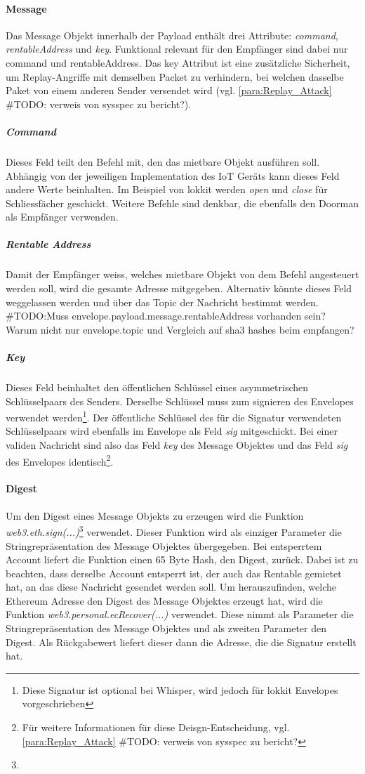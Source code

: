 \paragraph{Message}
\label{para:Message}
Das Message Objekt innerhalb der Payload enthält drei Attribute: \emph{command}, \emph{rentableAddress} und \emph{key}. Funktional relevant für den Empfänger sind dabei nur command und rentableAddress. Das key Attribut ist eine zusätzliche Sicherheit, um Replay-Angriffe mit demselben Packet zu verhindern, bei welchen dasselbe Paket von einem anderen Sender versendet wird (vgl. \ref{para:Replay_Attack} \#TODO: verweis von sysspec zu bericht?).
\subparagraph{Command}
\label{subpara:Command}
Dieses Feld teilt den Befehl mit, den das mietbare Objekt ausführen soll. Abhängig von der jeweiligen Implementation des IoT Geräts kann dieses Feld andere Werte beinhalten. Im Beispiel von lokkit werden \emph{open} und \emph{close} für Schliessfächer geschickt. Weitere Befehle sind denkbar, die ebenfalls den Doorman als Empfänger verwenden.
\subparagraph{Rentable Address}
Damit der Empfänger weiss, welches mietbare Objekt von dem Befehl angesteuert werden soll, wird die gesamte Adresse mitgegeben. Alternativ könnte dieses Feld weggelassen werden und über das Topic der Nachricht bestimmt werden.
\\\#TODO:Muss envelope.payload.message.rentableAddress vorhanden sein? Warum nicht nur envelope.topic und Vergleich auf sha3 hashes beim empfangen?

\subparagraph{Key}
\label{sys_para:Key}
Dieses Feld beinhaltet den öffentlichen Schlüssel eines asymmetrischen Schlüsselpaars des Senders. Derselbe Schlüssel muss zum signieren des Envelopes verwendet werden\footnote{Diese Signatur ist optional bei Whisper, wird jedoch für lokkit Envelopes vorgeschrieben}. Der öffentliche Schlüssel des für die Signatur verwendeten Schlüsselpaars wird ebenfalls im Envelope als Feld \emph{sig} mitgeschickt. Bei einer validen Nachricht sind also das Feld \emph{key} des Message Objektes und das Feld \emph{sig} des Envelopes identisch\footnote{Für weitere Informationen für diese Deisgn-Entscheidung, vgl. \ref{para:Replay_Attack} \#TODO: verweis von sysspec zu bericht?}.

\paragraph{Digest}
\label{para:Digest}
Um den Digest eines Message Objekts zu erzeugen wird die Funktion \emph{web3.eth.sign(...)}\footnote{} verwendet. Dieser Funktion wird als einziger Parameter die Stringrepräsentation des Message Objektes übergegeben. Bei entsperrtem Account liefert die Funktion einen 65 Byte Hash, den Digest, zurück. Dabei ist zu beachten, dass derselbe Account entsperrt ist, der auch das Rentable gemietet hat, an das diese Nachricht gesendet werden soll. Um herauszufinden, welche Ethereum Adresse den Digest des Message Objektes erzeugt hat, wird die Funktion \emph{web3.personal.ecRecover(...)} verwendet. Diese nimmt als Parameter die Stringrepräsentation des Message Objektes und als zweiten Parameter den Digest. Als Rückgabewert liefert dieser dann die Adresse, die die Signatur erstellt hat.

